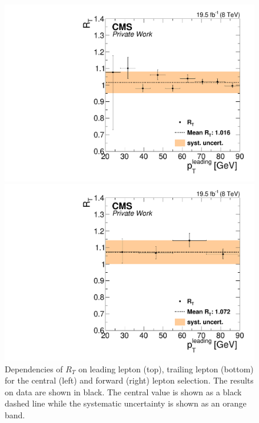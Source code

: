 \begin{figure}[htbp]
\begin{minipage}[t]{0.49\textwidth}
  \includegraphics[width=\textwidth]{plots/BG/trigger/Triggereff_SFvsOF_Syst_AlphaT_HighHTExclusiveCentral_Full2012_LeadingPt_trailingPt20.pdf}
\end{minipage}
\begin{minipage}[t]{0.49\textwidth}
\includegraphics[width=\textwidth]{plots/BG/trigger/Triggereff_SFvsOF_Syst_AlphaT_HighHTExclusiveForward_Full2012_LeadingPt_trailingPt20.pdf}
\end{minipage}

\caption{Dependencies of $R_T$ on leading lepton \pt (top), trailing lepton \pt (bottom) for the central (left) and forward (right) lepton selection. The results on data are shown in black. The central value is shown as a black dashed line while the systematic uncertainty is shown as an orange band.}
\label{fig:RTDependenciesApp1}
\end{figure}  

